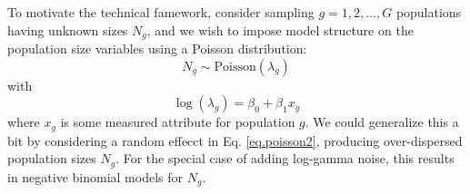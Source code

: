 To motivate the technical famework, 
consider sampling $g=1,2,\ldots,G$ populations having
unknown sizes $N_{g}$, and we wish to impose model structure on the
population size variables using a Poisson distribution:
\begin{equation}
 N_{g} \sim \mbox{Poisson}(\lambda_{g})
\label{eq.poisson1}
\end{equation}
with
\begin{equation}
\log( \lambda_{g} ) = \beta_{0} + \beta_{1} x_{g}
\label{eq.poisson2}
\end{equation}
where $x_{g}$ is some measured attribute for population $g$.   We
could generalize this a bit by considering a random effecct in
Eq. \ref{eq.poisson2}, producing over-dispersed population
sizes $N_{g}$. For the special case of adding log-gamma noise, this
results in negative binomial models for $N_{g}$.

